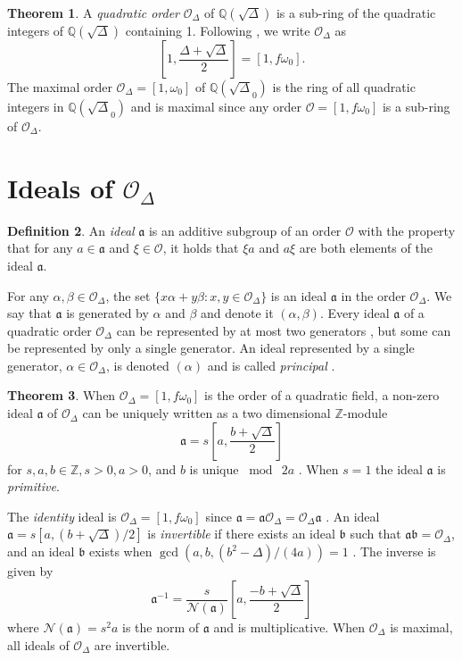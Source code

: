 \documentclass{ucalgthes1}
\theoremstyle{definition}
\newtheorem{thm}{Theorem}[section]
\newtheorem{defn}[thm]{Definition}
\newcommand{\OO}{\mathcal{O}}
\newcommand{\ZZ}{\mathbb{Z}}
\newcommand{\QQ}{\mathbb{Q}}
\begin{document}
\begin{thm}
A \emph{quadratic order} $\OO_\Delta$ of $\QQ(\sqrt\Delta)$ is a sub-ring of the quadratic integers of $\QQ(\sqrt\Delta)$ containing 1.  Following \cite[p.81]{Jacobson2009}, we write $\OO_\Delta$ as
\[
	\left[ 1, \frac{\Delta + \sqrt{\Delta}}{2} \right] = [1, f\omega_0].
\]
The maximal order $\OO_\Delta = [1, \omega_0]$ of $\QQ(\sqrt\Delta_0)$ is the ring of all quadratic integers in $\QQ(\sqrt\Delta_0)$ and is maximal since any order $\OO = [1, f\omega_0]$ is a sub-ring of $\OO_\Delta$. 
\end{thm}


\bigbreak
\section{Ideals of $\OO_\Delta$}

\begin{defn}
An \emph{ideal} $\mathfrak a$ is an additive subgroup of an order $\OO$ with the property that for any $a \in \mathfrak a$ and $\xi \in \OO$, it holds that $\xi a$ and $a \xi$ are both elements of the ideal $\mathfrak a$.
\end{defn}

For any $\alpha, \beta \in \OO_\Delta$, the set $\{x \alpha + y \beta : x, y \in \OO_\Delta\}$ is an ideal $\mathfrak a$ in the order $\OO_\Delta$.  We say that $\mathfrak a$ is generated by $\alpha$ and $\beta$ and denote it $(\alpha, \beta)$.  Every ideal $\mathfrak a$ of a quadratic order $\OO_\Delta$ can be represented by at most two generators \cite{Cohn1980}, but some can be represented by only a single generator. An ideal represented by a single generator, $\alpha \in \OO_\Delta$, is denoted $(\alpha)$ and is called \emph{principal} \cite[p.87]{Jacobson2009}.

\begin{thm}
\label{thm:idealZModule}
When $\OO_\Delta = [1, f\omega_0]$ is the order of a quadratic field, a non-zero ideal $\mathfrak a$ of $\OO_\Delta$ can be uniquely written as a two dimensional $\ZZ$-module 
\[
	\mathfrak a = s\left[a, \frac{b+\sqrt{\Delta}}{2} \right]
\]
for $s, a, b \in \ZZ, s > 0, a > 0$, and $b$ is unique $\bmod ~2a$ \cite[p.86]{Jacobson2009}. When $s = 1$ the ideal $\mathfrak a$ is \emph{primitive}.
\end{thm}

The \emph{identity} ideal is $\OO_\Delta = [1, f\omega_0]$ since $\mathfrak a = \mathfrak a \OO_\Delta = \OO_\Delta \mathfrak a$ \cite{Cohn1980}. An ideal $\mathfrak a = s[a, (b+\sqrt{\Delta})/2]$ is \emph{invertible} if there exists an ideal $\mathfrak b$ such that $\mathfrak a \mathfrak b = \OO_\Delta$, and an ideal $\mathfrak b$ exists when $\gcd(a, b, (b^2-\Delta)/(4a)) = 1$ \cite[p.14]{Jacobson1999}. The inverse is given by \cite[pp.14,15]{Jacobson1999}
\[
	{\mathfrak a}^{-1} = \frac{s}{\mathcal N(\mathfrak a)} \left[a, \frac{-b+\sqrt{\Delta}}{2} \right]
\]
where $\mathcal N(\mathfrak a) = s^2a$ is the norm of $\mathfrak a$ and is multiplicative. When $\OO_\Delta$ is maximal, all ideals of $\OO_\Delta$ are invertible. 
\end{document}
